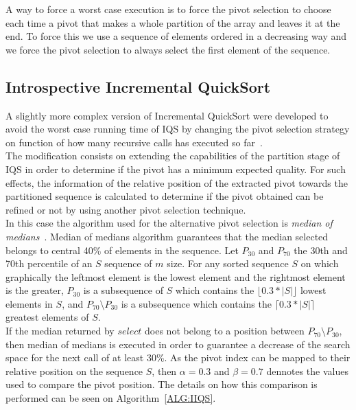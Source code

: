 A way to force a worst case execution is to force the pivot selection to choose each time a pivot that makes a whole partition of the array and leaves it at the end. To force this we use a sequence of elements ordered in a decreasing way and we force the pivot selection to always select the first element of the sequence.\\

\subsection{Introspective Incremental QuickSort}
\label{SUBSECTION:IIQS}

A slightly more complex version of Incremental QuickSort were developed to avoid the worst case running time of IQS by changing the pivot selection strategy on function of how many recursive calls has executed so far~\cite{7416566}.\\

The modification consists on extending the capabilities of the partition stage of IQS in order to determine if the pivot has a minimum expected quality. For such effects, the information of the relative position of the extracted pivot towards the partitioned sequence is calculated to determine if the pivot obtained can be refined or not by using another pivot selection technique.\\

In this case the algorithm used for the alternative pivot selection is \textit{median of medians}~\cite{Blum_Floyd_Pratt_Rivest_Tarjan_1973}. Median of medians algorithm guarantees that the median selected belongs to central 40\% of elements in the sequence. Let $P_{30}$ and $P_{70}$ the 30th and 70th percentile of an $S$ sequence of $m$ size. For any sorted sequence $S$ on which graphically the leftmost element is the lowest element and the rightmost element is the greater, $P_{30}$ is a subsequence of $S$ which contains the $\lfloor0.3*|S|\rfloor$ lowest elements in $S$, and $P_{70} \setminus P_{30}$ is a subsequence which contains the $\lceil0.3*|S|\rceil$ greatest elements of $S$.\\

If the median returned by $select$ does not belong to a position between $P_{70} \setminus P_{30}$, then median of medians is executed in order to guarantee a decrease of the search space for the next call of at least 30\%. As the pivot index can be mapped to their relative position on the sequence $S$, then $\alpha=0.3$ and $\beta=0.7$ dennotes the values used to compare the pivot position. The details on how this comparison is performed can be seen on Algorithm~\ref{ALG:IIQS}.\\

